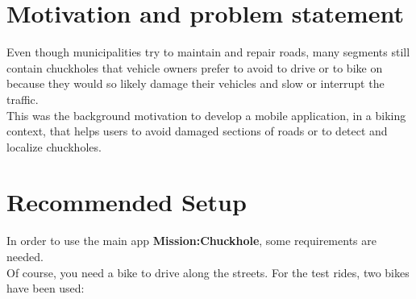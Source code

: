 \documentclass[10pt,a4paper]{article} %
\begin{document}
    \pagestyle{plain}
    \title{\rmfamily\normalfont{}}
    \author{}
    \date{} %
    
    \maketitle
    

    \tableofcontents
    


    \section{Motivation and problem statement}

	

Even though municipalities try to maintain and repair roads, many segments still contain chuckholes that vehicle owners prefer to avoid to drive or to bike on because they would so likely damage their vehicles and slow or interrupt the traffic.\\
This was the background motivation to develop a mobile application, in a biking context, that helps users to avoid damaged sections of roads or to detect and localize chuckholes.

    \section{Recommended Setup}

	In order to use the main app \textbf{Mission:Chuckhole}, some requirements are needed.\\
	Of course, you need a bike to drive along the streets.
	For the test rides, two bikes have been used:
\end{document}
